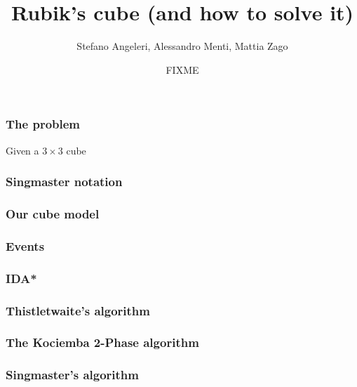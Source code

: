 \documentclass{beamer}
\title{Rubik's cube (and how to solve it)}
\author{Stefano Angeleri, Alessandro Menti, Mattia Zago}
\date{FIXME}
\begin{document}
\begin{frame}
\maketitle
\end{frame}

\begin{frame}
\frametitle{The problem}
Given a $3\times 3$ cube
\end{frame}
\begin{frame}
\frametitle{Singmaster notation}
\end{frame}
\begin{frame}
\frametitle{Our cube model}
\end{frame}
\begin{frame}
\frametitle{Events}
\end{frame}
\begin{frame}
\frametitle{IDA*}
\end{frame}
\begin{frame}
\frametitle{Thistletwaite's algorithm}
\end{frame}
\begin{frame}
\frametitle{The Kociemba 2-Phase algorithm}
\end{frame}
\begin{frame}
\frametitle{Singmaster's algorithm}
\end{frame}
\end{document}
